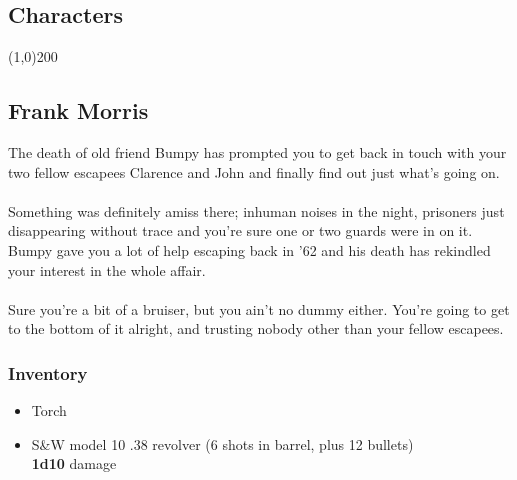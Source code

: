 \documentclass[12pt,a4paper]{article}
\begin{document}
\begin{center}
\section*{Characters}
\line(1,0){200}
\end{center}
\vspace{1em}
\subsection*{Frank Morris}
The death of old friend Bumpy has prompted you to get back in touch with your two fellow escapees Clarence and John and finally find out just what's going on.\\\\
Something was definitely amiss there; inhuman noises in the night, prisoners just disappearing without trace and you're sure one or two guards were in on it.  Bumpy gave you a lot of help escaping back in '62 and his death has rekindled your interest in the whole affair.\\\\
Sure you're a bit of a bruiser, but you ain't no dummy either.  You're going to get to the bottom of it alright, and trusting nobody other than your fellow escapees.
\subsubsection*{Inventory}
\begin{itemize}
\item{Torch}
\item{S\&W model 10 .38 revolver (6 shots in barrel, plus 12 bullets)}\\\textbf{1d10} damage
\end{itemize}
\newpage
\end{document}
